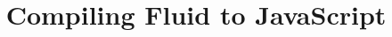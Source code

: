 \documentclass[preprint,acmsmall,screen]{acmart}
\begin{document}
\title{Compiling Fluid to JavaScript}


\maketitle



\clearpage
\pagebreak

\end{document}
